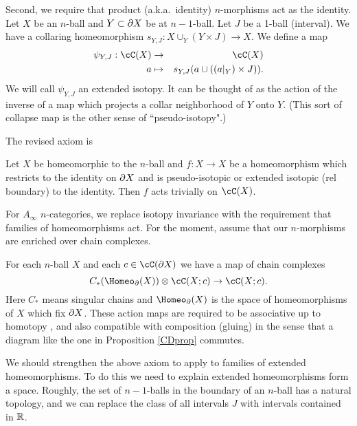 Second, we require that product (a.k.a.\ identity) $n$-morphisms act as the identity.
Let $X$ be an $n$-ball and $Y\subset\partial X$ be at $n{-}1$-ball.
Let $J$ be a 1-ball (interval).
We have a collaring homeomorphism $s_{Y,J}: X\cup_Y (Y\times J) \to X$.
We define a map
\begin{eqnarray*}
	\psi_{Y,J}: \cC(X) &\to& \cC(X) \\
	a & \mapsto & s_{Y,J}(a \cup ((a|_Y)\times J)) .
\end{eqnarray*}
We will call $\psi_{Y,J}$ an extended isotopy.
It can be thought of as the action of the inverse of
a map which projects a collar neighborhood of $Y$ onto $Y$.
(This sort of collapse map is the other sense of ``pseudo-isotopy".)

The revised axiom is

{Let $X$ be homeomorphic to the $n$-ball and $f: X\to X$ be a homeomorphism which restricts
to the identity on $\partial X$ and is pseudo-isotopic or extended isotopic (rel boundary) to the identity.
Then $f$ acts trivially on $\cC(X)$.}


\smallskip

For $A_\infty$ $n$-categories, we replace
isotopy invariance with the requirement that families of homeomorphisms act.
For the moment, assume that our $n$-morphisms are enriched over chain complexes.

{For each $n$-ball $X$ and each $c\in \cC(\bd X)$ we have a map of chain complexes
\[
	C_*(\Homeo_\bd(X))\ot \cC(X; c) \to \cC(X; c) .
\]
Here $C_*$ means singular chains and $\Homeo_\bd(X)$ is the space of homeomorphisms of $X$
which fix $\partial X$.
These action maps are required to be associative up to homotopy
, and also compatible with composition (gluing) in the sense that
a diagram like the one in Proposition \ref{CDprop} commutes.
}

We should strengthen the above axiom to apply to families of extended homeomorphisms.
To do this we need to explain extended homeomorphisms form a space.
Roughly, the set of $n{-}1$-balls in the boundary of an $n$-ball has a natural topology,
and we can replace the class of all intervals $J$ with intervals contained in $\mathbb{R}$.

